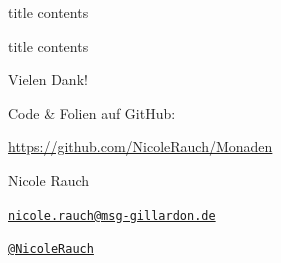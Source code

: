 \begin{frame}[fragile]{title}
contents
\end{frame}

\begin{frame}[fragile]{title}
contents

\end{frame}


{
\begin{frame}{Vielen Dank!}

        Code \& Folien auf GitHub:
        \begin{center}
                \url{https://github.com/NicoleRauch/Monaden}
        \end{center}

        \begin{block}{Nicole Rauch}
        \begin{description}[Twitterxx]
                \item[E-Mail]  \href{mailto:nicole.rauch@msg-gillardon.de}{\texttt{nicole.rauch@msg-gillardon.de}}
                \item[Twitter] \href{http://twitter.com/NicoleRauch}{\texttt{@NicoleRauch}}
        \end{description}
        \end{block}
\end{frame}
}

